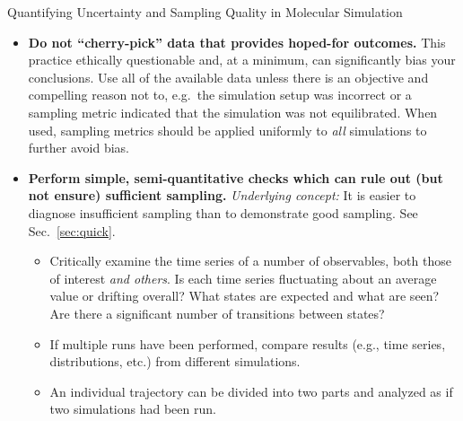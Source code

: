 \begin{Checklists*}[p!]
\begin{checklist}{Quantifying Uncertainty and Sampling Quality in Molecular Simulation}
\begin{itemize}
\item
  \textbf{Do not ``cherry-pick'' data that provides hoped-for outcomes.}
  This practice ethically questionable and, at a minimum, can significantly bias your conclusions.
  Use all of the available data unless there is an objective and compelling reason not to, e.g.\ the simulation setup was incorrect or a sampling metric indicated that the simulation was not equilibrated.
  When used, sampling metrics should be applied uniformly to \emph{all} simulations to further avoid bias.
    
\item
\textbf{Perform simple, semi-quantitative checks which can rule out (but not ensure) sufficient sampling.} \emph{Underlying concept:} It is easier to diagnose insufficient sampling than to demonstrate good sampling.  See Sec.\ \ref{sec:quick}.
    \begin{itemize}
    \item Critically examine the time series of a number of observables, both those of interest \emph{and others}.
      Is each time series fluctuating about an average value or drifting overall?
      What states are expected and what are seen?
      Are there a significant number of transitions between states?
    \item If multiple runs have been performed, compare results (e.g., time series, distributions, etc.) from different simulations.
    \item An individual trajectory can be divided into two parts and analyzed as if two simulations had been run.
    \end{itemize}
        \vspace{-0.325\baselineskip} %


\end{itemize}
\end{checklist}
\end{Checklists*}
